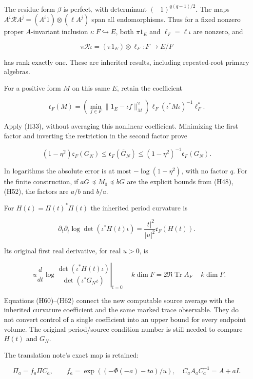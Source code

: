 The residue form \(\beta\) is perfect, with determinant
\((-1)^{q(q-1)/2}\). The maps
\(A^i\mathcal RA^j=(A^i1)\otimes(\ell A^j)\) span all endomorphisms.
Thus for a fixed nonzero proper \(A\)-invariant inclusion
\(\iota:F\hookrightarrow E\), both \(\pi1_E\) and \(\ell_F=\ell\iota\)
are nonzero, and

\[
 \pi\mathcal R\iota=(\pi1_E)\otimes\ell_F:F\to E/F
 \tag{H58}
\]

has rank exactly one. These are inherited results, including
repeated-root primary algebras.

For a positive form \(M\) on this same \(E\), retain the coefficient

\[
 \mathfrak c_F(M)=
 \left(\min_{f\in F}\|1_E-\iota f\|_M^2\right)
 \ell_F(\iota^*M\iota)^{-1}\ell_F^*.
 \tag{H59}
\]

Apply (H33), without averaging this nonlinear coefficient. Minimizing
the first factor and inverting the restriction in the second factor
prove

\[
 \boxed{
 (1-\eta^2)\mathfrak c_F(G_N)
 \leq\mathfrak c_F(\overline G_N)
 \leq(1-\eta^2)^{-1}\mathfrak c_F(G_N).}
 \tag{H60}
\]

In logarithms the absolute error is at most \(-\log(1-\eta^2)\), with no
factor \(q\). For the finite construction, if
\(aG\preceq M_0\preceq bG\) are the explicit bounds from (H48), (H52),
the factors are \(a/b\) and \(b/a\).

For \(H(t)=\Pi(t)^*\Pi(t)\) the inherited period curvature is

\[
 \partial_t\partial_{\bar t}\log\det(\iota^*H(t)\iota)
 =\frac{|t|^2}{|u|^2}\mathfrak c_F(H(t)).
 \tag{H61}
\]

Its original first real derivative, for real \(u>0\), is

\[
 -u\left.\frac d{dt}\log
 \frac{\det(\iota^*H(t)\iota)}{\det(\iota^*G_N\iota)}
 \right|_{t=0}-k\dim F
 =2\Re\operatorname{Tr}A_F-k\dim F.
 \tag{H62}
\]

Equations (H60)--(H62) connect the new computable source average with
the inherited curvature coefficient and the same marked trace
observable. They do not convert control of a single coefficient into an
upper bound for every endpoint volume. The original period/source
condition number is still needed to compare \(H(t)\) and \(G_N\).

The translation note's exact map is retained:

\[
 \Pi_a=f_a\Pi C_a,\qquad
 f_a=\exp((-\Phi(-a)-ta)/u),\quad
 C_aA_aC_a^{-1}=A+aI.
 \tag{H63}
\]

